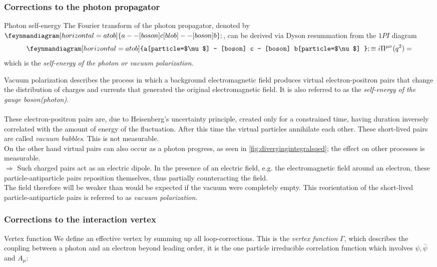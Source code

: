 \subsubsection{Corrections to the photon propagator}
\begin{mybox}{Photon self-energy}
The Fourier transform of the photon propagator, denoted by $\feynmandiagram[horizontal=a to b]{a --[boson] c [blob] --[boson]b};$, can be derived via Dyson resummation from the $1PI$ diagram 
\begin{equation}
\feynmandiagram[horizontal=a to b]{a[particle=$\mu$] -- [boson] c -- [boson] b[particle=$\nu$] };
\equiv i \Pi^{\mu \nu} (q^2) = 
\end{equation}
which is the \emph{self-energy of the photon or vacuum polarization}.
\end{mybox}
Vacuum polarization describes the process in which a background electromagnetic field produces virtual electron-positron pairs that change the distribution of charges and currents that generated the original electromagnetic field. It is also referred to as the \emph{self-energy of the gauge boson(photon)}.\\
\\
These electron-positron pairs are, due to Heisenberg's uncertainty principle, created only for a constrained time, having duration inversely correlated with the amount of energy of the fluctuation. After this time the virtual particles annihilate each other. These short-lived pairs are called \emph{vacuum bubbles}. This is not measurable.\\
On the other hand virtual pairs can also occur as a photon progress, as seen in \ref{fig:divergingintegralsqed}; the effect on other processes is measurable.\\
$\Rightarrow$ Such charged pairs act as an electric dipole. In the presence of an electric field, e.g. the electromagnetic field around an electron, these particle-antiparticle pairs reposition themselves, thus partially counteracting the field.\\
The field therefore will be weaker than would be expected if the vacuum were completely empty. This reorientation of the short-lived particle-antiparticle pairs is referred to as  \emph{vacuum polarization}.

\subsubsection{Corrections to the interaction vertex}
\begin{mybox}{Vertex function}
	We define an effective vertex by summing up all loop-corrections. This is the \emph{vertex function} $\Gamma$, which describes the coupling between a photon and an electron beyond leading order, it is the one particle irreducible correlation function which involves $ \psi, \bar{\psi}$ and $A_{\mu}$:

\end{mybox}
	
